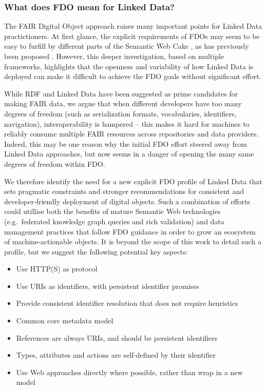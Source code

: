 \subsubsection{What does FDO mean for Linked Data?}\label{ch3:what-does-it-mean-for-linked-data}

The FAIR Digital Object approach raises many important points for Linked Data practictioners.
At first glance, the explicit requirements of FDOs may seem to be easy to furfill by different parts of the Semantic Web Cake \cite[slide 10]{SemanticWebXML2000}, as has previously been proposed \cite{10.3897/rio.8.e94501}.
However, this deeper investigation, based on multiple frameworks, highlights that the openness and variability of how Linked Data is deployed can make it difficult to achieve the FDO goals without significant effort.

While RDF and Linked Data have been suggested as prime candidates for making FAIR data, we argue that when different developers have too many degrees of freedom (such as serialization formats, vocabularies, identifiers, navigation), interoperability is hampered -- this makes it hard for machines to reliably consume multiple FAIR resources across repositories and data providers. 
Indeed, this may be one reason why the initial FDO effort steered away from Linked Data approaches, but now seems in a danger of opening the many same degrees of freedom within FDO.

We therefore identify the need for a new explicit FDO profile of Linked Data that sets pragmatic constraints and stronger recommendations for consistent and developer-friendly deployment of digital objects. 
Such a combination of efforts could utillise both the benefits of mature Semantic Web technologies (e.g.~federated knowledge graph queries and rich validation) and data management practices that follow FDO guidance in order to grow an ecosystem of machine-actionable objects. 
It is beyond the scope of this work to detail such a profile, but we suggest the following potential key aspects:

\begin{itemize}
  \item Use HTTP(S) as protocol
  \item Use URIs as identifiers, with persistent identifier promises
  \item Provide consistent identifier resolution that does not require heuristics
  \item Common core metadata model
  \item References are always URIs, and should be persistent identifiers
  \item Types, attributes and actions are self-defined by their identifier
  \item Use Web approaches directly where possible, rather than wrap in a new model
\end{itemize}

